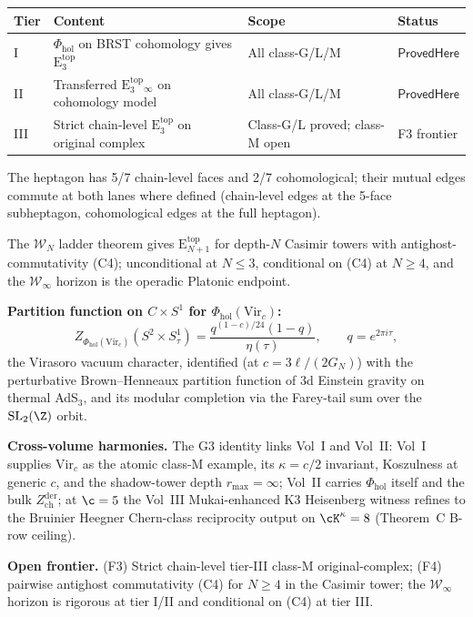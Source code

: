 \documentclass{article}
\theoremstyle{definition}
\theoremstyle{remark}
\newcommand{\Phihol}{\Phi_{\mathrm{hol}}}
\newcommand{\Zder}{Z^{\mathrm{der}}_{\mathrm{ch}}}
\newcommand{\Etop}[1]{\mathrm{E}_{#1}^{\mathrm{top}}}
\newcommand{\Vir}{\mathrm{Vir}}
\newcommand{\cW}{\mathcal{W}}
\begin{document}
\begin{center}
\begin{tabular}{|l|l|l|l|}
\hline
\textbf{Tier} & \textbf{Content} & \textbf{Scope} & \textbf{Status} \\
\hline
I & $\Phihol$ on BRST cohomology gives $\Etop{3}$ &
All class-G/L/M &
$\mathsf{ProvedHere}$ \\
II & Transferred $\Etop{3}_{\infty}$ on cohomology model &
All class-G/L/M &
$\mathsf{ProvedHere}$ \\
III & Strict chain-level $\Etop{3}$ on original complex &
Class-G/L proved; class-M open &
F3 frontier \\
\hline
\end{tabular}
\end{center}

The heptagon has 5/7 chain-level faces and 2/7 cohomological; their
mutual edges commute at both lanes where defined (chain-level edges
at the 5-face subheptagon, cohomological edges at the full heptagon).

The $\cW_N$ ladder theorem gives $\Etop{N+1}$ for depth-$N$ Casimir
towers with antighost-commutativity (C4); unconditional at $N \leq 3$,
conditional on (C4) at $N \geq 4$, and the $\cW_\infty$ horizon is
the operadic Platonic endpoint.

\textbf{Partition function on $C\times S^1$ for $\Phihol(\Vir_c)$:}
\begin{equation}\label{eq:final-partition}
 Z_{\Phihol(\Vir_c)}(S^2\times S^1_\tau) =
 \frac{q^{(1-c)/24}(1-q)}{\eta(\tau)},
 \qquad q = e^{2\pi i\tau},
\end{equation}
the Virasoro vacuum character, identified (at $c = 3\ell/(2G_N)$)
with the perturbative Brown--Henneaux partition function of 3d
Einstein gravity on thermal AdS$_3$, and its modular completion
via the Farey-tail sum over the $\mathrm{SL}_2(\Z)$ orbit.

\textbf{Cross-volume harmonies.} The G3 identity links Vol~I and
Vol~II: Vol~I supplies $\Vir_c$ as the atomic class-M example, its
$\kappa = c/2$ invariant, Koszulness at generic $c$, and the
shadow-tower depth $r_{\max} = \infty$; Vol~II carries $\Phihol$
itself and the bulk $\Zder$; at $\c = 5$ the Vol~III Mukai-enhanced
K3 Heisenberg witness refines to the Bruinier Heegner Chern-class
reciprocity output on $\cK^\kappa = 8$ (Theorem~C B-row ceiling).

\textbf{Open frontier.} (F3) Strict chain-level tier-III class-M
original-complex; (F4) pairwise antighost commutativity (C4) for
$N \geq 4$ in the Casimir tower; the $\cW_\infty$ horizon is
rigorous at tier I/II and conditional on (C4) at tier III.
\end{document}
